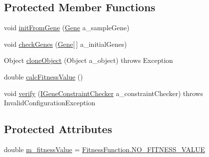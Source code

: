 \subsection*{Protected Member Functions}
\begin{DoxyCompactItemize}
\item 
void \hyperlink{classorg_1_1jgap_1_1_chromosome_aa6b7f021f64700b1926d5819f5fde5aa}{init\-From\-Gene} (\hyperlink{interfaceorg_1_1jgap_1_1_gene}{Gene} a\-\_\-sample\-Gene)
\item 
void \hyperlink{classorg_1_1jgap_1_1_chromosome_a74df7a8e7986a3ed2a18c9715fae7b90}{check\-Genes} (\hyperlink{interfaceorg_1_1jgap_1_1_gene}{Gene}\mbox{[}$\,$\mbox{]} a\-\_\-initial\-Genes)
\item 
Object \hyperlink{classorg_1_1jgap_1_1_chromosome_adf4d7c5113d0c70283ffb2323b7e0cda}{clone\-Object} (Object a\-\_\-object)  throws Exception 
\item 
double \hyperlink{classorg_1_1jgap_1_1_chromosome_aea063618aebe23aa8579baf20063db24}{calc\-Fitness\-Value} ()
\item 
void \hyperlink{classorg_1_1jgap_1_1_chromosome_af472c1bacfaf6e5e5c1d5ac3af75ddef}{verify} (\hyperlink{interfaceorg_1_1jgap_1_1_i_gene_constraint_checker}{I\-Gene\-Constraint\-Checker} a\-\_\-constraint\-Checker)  throws Invalid\-Configuration\-Exception 
\end{DoxyCompactItemize}
\subsection*{Protected Attributes}
\begin{DoxyCompactItemize}
\item 
double \hyperlink{classorg_1_1jgap_1_1_chromosome_a905236819a9904ca3d096fa1c325aa1b}{m\-\_\-fitness\-Value} = \hyperlink{classorg_1_1jgap_1_1_fitness_function_a5f1f23e6f8a0f9606aee5d52fac6a06b}{Fitness\-Function.\-N\-O\-\_\-\-F\-I\-T\-N\-E\-S\-S\-\_\-\-V\-A\-L\-U\-E}
\end{DoxyCompactItemize}
